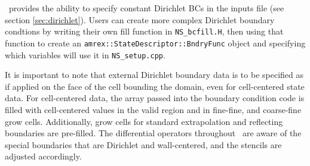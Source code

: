 \iamr\ provides the ability to specify constant Dirichlet BCs 
in the inputs file (see section \ref{sec:dirichlet}).
Users can create more complex Dirichlet boundary condtions by writing
their own fill function in {\tt NS\_bcfill.H}, then using that function to create
an {\tt amrex::StateDescriptor::BndryFunc} object and specifying which variables
will use it in {\tt NS\_setup.cpp}. 

It is important to note that external Dirichlet boundary data is to be specified as 
if applied on the face of the cell bounding the domain, even for cell-centered
state data. For cell-centered data, the array passed into the 
boundary condition code is filled with cell-centered values in the valid 
region and in fine-fine, and coarse-fine grow cells.  Additionally, grow cells 
for standard extrapolation and reflecting boundaries are pre-filled.  The 
differential operators throughout \iamr\ are aware of the special boundaries
that are Dirichlet and wall-centered, and the stencils are adjusted accordingly.

